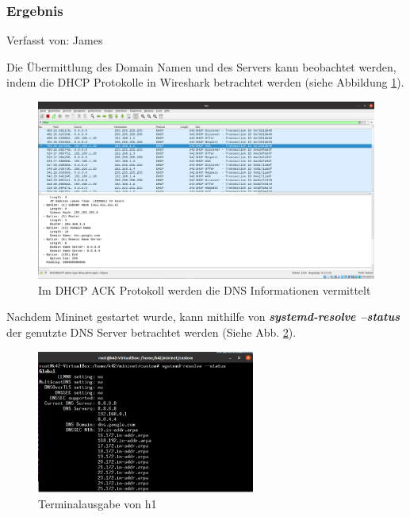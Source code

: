 \documentclass[fontsize=12pt,paper=a4,open=any,parskip=half,
  twoside=false,toc=listof,toc=bibliography,fleqn,leqno,
  captions=nooneline,captions=tableabove,british]{scrbook}
\begin{document}
{\newpage
\subsubsection{Ergebnis}
{\tiny Verfasst von: James\par}
Die Übermittlung des Domain Namen und des Servers kann beobachtet werden, indem die DHCP Protokolle in Wireshark betrachtet werden \cite{dhcpd3}(siehe Abbildung \ref{dns2}).  

\begin{figure}[H]
	\centering
	\includegraphics[width=1\textwidth]{Bilder/dns2}
	\captionsetup{justification=centering}
	\caption{Im DHCP ACK Protokoll werden die DNS Informationen vermittelt}
	\label{dns2}
\end{figure}

Nachdem Mininet gestartet wurde, kann mithilfe von \textit{\textbf{systemd-resolve –status}} der genutzte DNS Server betrachtet werden \cite{system}(Siehe Abb. \ref{dns3}).
\begin{figure}[H]
	\centering
	\includegraphics[width=0.64\textwidth]{Bilder/dns3}
	\captionsetup{justification=centering}
	\caption{Terminalausgabe von h1}
	\label{dns3}
\end{figure}

\newpage
}
\end{document}
